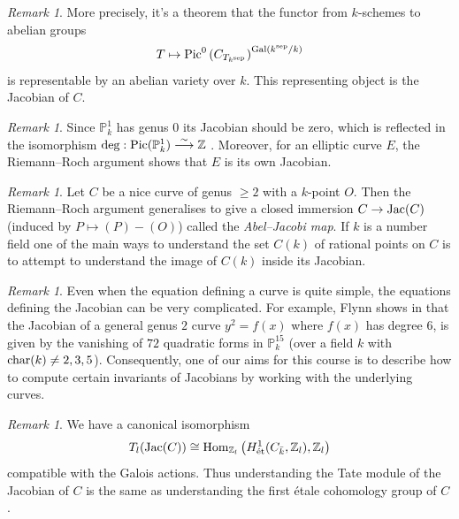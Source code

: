 \documentclass[12pt]{amsart}
\numberwithin{equation}{section}
\theoremstyle{remark}
\newtheorem{remark}[equation]{Remark}
\theoremstyle{definition}
\theoremstyle{definition}
\theoremstyle{definition}
\theoremstyle{definition}
\theoremstyle{definition}
\theoremstyle{definition}
\begin{document}
\begin{remark} \label{actual defi remark}
More precisely, it's a theorem that the functor from $k$-schemes to abelian groups
\[T\mapsto \textup{Pic}^0\left(C_{T_{k^\textup{sep}}}\right)^{\textup{Gal}(k^\textup{sep}/k)}\]
is representable by an abelian variety over $k$. This representing object is the Jacobian of $C$.
\end{remark}

\begin{remark}
Since $\mathbb{P}^1_k$ has genus $0$ its Jacobian should be zero, which is reflected in the isomorphism $\textup{deg}:\textup{Pic}(\mathbb{P}^1_k)\stackrel{\sim}{\longrightarrow} \mathbb{Z}$ . Moreover, for an elliptic curve $E$, the Riemann--Roch argument shows that $E$ is its own Jacobian. 
\end{remark}

\begin{remark}
Let $C$ be a nice curve of genus $\geq 2$ with a $k$-point $O$. Then the Riemann--Roch argument generalises to give a closed immersion
$C\rightarrow \textup{Jac}(C)$ (induced by $P\mapsto (P)-(O)$)
called the \textit{Abel--Jacobi map}. If $k$ is a number field one of the main ways to understand the set $C(k)$ of rational points on $C$ is to attempt to understand the image of $C(k)$ inside its Jacobian.
\end{remark}

\begin{remark}
Even when the equation defining a curve is quite simple, the equations defining the Jacobian can be very complicated. For example, Flynn shows in \cite{MR1041476} that the Jacobian of a general genus $2$ curve $y^2=f(x)$ where $f(x)$ has degree $6$, is given by the vanishing of $72$ quadratic forms in $\mathbb{P}^{15}_k$ (over a field $k$ with $\textup{char}(k)\neq 2,3,5$). Consequently, one of our aims for this course is to describe how to compute certain invariants of Jacobians by working with the underlying curves. 
\end{remark}

\begin{remark}
We have a canonical isomorphism 
\[T_l(\textup{Jac}(C))\cong \textup{Hom}_{\mathbb{Z}_l}\left(H^1_{\textup{\'{e}t}}(C_{\bar{k}},\mathbb{Z}_l),\mathbb{Z}_l\right)\]
compatible with the Galois actions. Thus understanding the Tate module of the Jacobian of $C$ is the same as understanding the first \'{e}tale cohomology group of $C$.
\end{remark}
\end{document}
